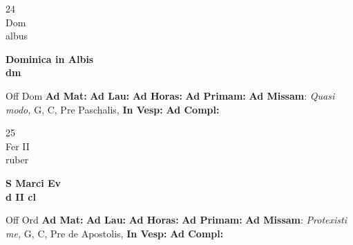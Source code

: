 \documentclass[10pt, openany]{book}
\begin{document}
    \begin{center}
        \begin{minipage}{3.5in}
            \vspace{2em}
            \begin{minipage}{0.5in}
                {\Huge 24} \\
                {\normalsize Dom} \\
                {\normalsize albus}
            \end{minipage}
            \begin{minipage}{3.0in}
                \textbf{ \large Dominica in Albis \\
                \textnormal{\normalsize dm}} \\ 
            \end{minipage}
            \begin{justify}Off Dom
                \textbf{Ad Mat: }
                \textbf{Ad Lau: }
                \textbf{Ad Horas: }
                \textbf{Ad Primam: }\textbf{Ad Missam}: \textit{Quasi modo,} G, C, Pre Paschalis,  
                \textbf{In Vesp: }
                \textbf{Ad Compl: }
            \end{justify}
        \end{minipage}
    \end{center}

    \begin{center}
        \begin{minipage}{3.5in}
            \vspace{2em}
            \begin{minipage}{0.5in}
                {\Huge 25} \\
                {\normalsize Fer II} \\
                {\normalsize ruber}
            \end{minipage}
            \begin{minipage}{3.0in}
                \textbf{ \large S Marci Ev \\
                \textnormal{\normalsize d II cl}} \\ 
            \end{minipage}
            \begin{justify}Off Ord
                \textbf{Ad Mat: }
                \textbf{Ad Lau: }
                \textbf{Ad Horas: }
                \textbf{Ad Primam: }\textbf{Ad Missam}: \textit{Protexisti me,} G, C, Pre de Apostolis,  
                \textbf{In Vesp: }
                \textbf{Ad Compl: }
            \end{justify}
        \end{minipage}
    \end{center}
\end{document}
